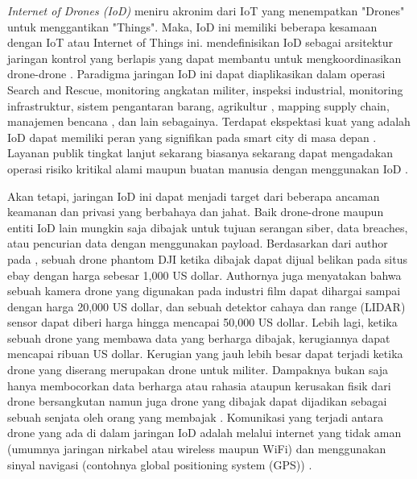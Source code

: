 \emph{Internet of Drones (IoD)} meniru akronim dari IoT yang menempatkan "Drones" untuk menggantikan "Things". Maka, IoD ini memiliki beberapa kesamaan dengan IoT atau Internet of Things ini. \citet{gharibi2016internet} mendefinisikan IoD sebagai arsitektur jaringan kontrol yang berlapis yang dapat membantu untuk mengkoordinasikan drone-drone \citep{choudhary2018internet}. Paradigma jaringan IoD ini dapat diaplikasikan dalam operasi Search and Rescue, monitoring angkatan militer, inspeksi industrial, monitoring infrastruktur, sistem pengantaran barang\citep{times2020food}, agrikultur \citep{yazdinejad2020enabling} \citep{boursianis2020internet}, mapping supply chain, manajemen bencana \citep{magistretti2019unveiling} \citep{paddeu2019new}, dan lain sebagainya. Terdapat ekspektasi kuat yang adalah IoD dapat memiliki peran yang signifikan pada smart city di masa depan \citep{vattapparamban2016drones}. Layanan publik tingkat lanjut sekarang biasanya sekarang dapat mengadakan operasi risiko kritikal alami maupun buatan manusia dengan menggunakan IoD \citep{polka2017use} \citep{kharchenko2018cybersecurity}. 

Akan tetapi, jaringan IoD ini dapat menjadi target dari beberapa ancaman keamanan dan privasi yang berbahaya dan jahat. Baik drone-drone maupun entiti IoD lain mungkin saja dibajak untuk tujuan serangan siber, data breaches, atau pencurian data dengan menggunakan payload. Berdasarkan dari author pada \citep{thiobane2015cybersecurity}, sebuah drone phantom DJI ketika dibajak dapat dijual belikan pada situs ebay dengan harga sebesar 1,000 US dollar. Authornya juga menyatakan bahwa sebuah kamera drone yang digunakan pada industri film dapat dihargai sampai dengan harga 20,000 US dollar, dan sebuah detektor cahaya dan range (LIDAR) sensor dapat diberi harga hingga mencapai 50,000 US dollar. Lebih lagi, ketika sebuah drone yang membawa data yang berharga dibajak, kerugiannya dapat mencapai ribuan US dollar. Kerugian yang jauh lebih besar dapat terjadi ketika drone yang diserang merupakan drone untuk militer. Dampaknya bukan saja hanya membocorkan data berharga atau rahasia ataupun kerusakan fisik dari drone bersangkutan namun juga drone yang dibajak dapat dijadikan sebagai sebuah senjata oleh orang yang membajak \citep{thiobane2015cybersecurity}. Komunikasi yang terjadi antara drone yang ada di dalam jaringan IoD adalah melalui internet yang tidak aman (umumnya jaringan nirkabel atau wireless maupun WiFi) dan menggunakan sinyal navigasi (contohnya global positioning system (GPS)) \citep{rodrigues2019authentication}. 

